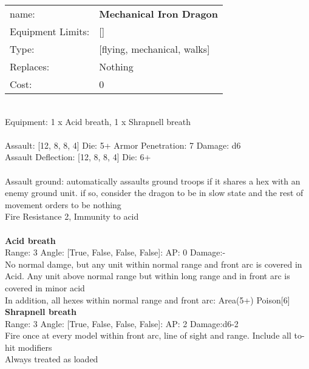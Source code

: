 \noindent
\begin{tabular}{ll}
name: &{\bf Mechanical Iron Dragon } \\
Equipment Limits: &[] \\
Type: &[flying, mechanical, walks] \\
Replaces: &Nothing \\
Cost: & 0\\
\end{tabular}
\ \\
Equipment: 1 x Acid breath, 1 x Shrapnell breath \\
\ \\
Assault: [12, 8, 8, 4] Die: 5+ Armor Penetration: 7 Damage: d6 \\
Assault Deflection: [12, 8, 8, 4] Die: 6+\\
\indent  
\ \\
Assault ground: automatically assaults ground troops if it shares a hex with an enemy ground unit. if so, consider the dragon to be in slow state and the rest of movement orders to be nothing\\ 
Fire Resistance 2, Immunity to acid\\ 

\ \\
{\bf Acid breath } \\



Range: 3  Angle: [True, False, False, False]: AP: 0 Damage:- \\
No normal damge, but any unit within normal range and front arc is covered in Acid. Any unit above normal range but within long range and in front arc is covered in minor acid\\ 
In addition, all hexes within normal range and front arc: Area(5+) Poison[6]\\ 




{\bf Shrapnell breath } \\



Range: 3  Angle: [True, False, False, False]: AP: 2 Damage:d6-2 \\
Fire once at every model within front arc, line of sight and range. Include all to-hit modifiers\\ 
Always treated as loaded\\ 




 
\ \\



